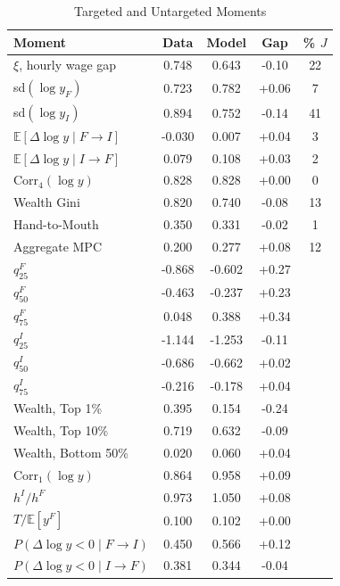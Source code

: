\begin{table}[htbp]
\centering
\caption{Targeted and Untargeted Moments}
\label{tab:moments}
\footnotesize
\begin{tabular}{lcccc}
\toprule
Moment & Data & Model & Gap & \% $J$ \\
\midrule
$\xi$, hourly wage gap & 0.748 & 0.643 & -0.10 & 22 \\
sd$(\log y_F)$ & 0.723 & 0.782 & +0.06 & 7 \\
sd$(\log y_I)$ & 0.894 & 0.752 & -0.14 & 41 \\
$\mathbb{E}[\Delta \log y \mid F \to I]$ & -0.030 & 0.007 & +0.04 & 3 \\
$\mathbb{E}[\Delta \log y \mid I \to F]$ & 0.079 & 0.108 & +0.03 & 2 \\
$\mathrm{Corr}_4(\log y)$ & 0.828 & 0.828 & +0.00 & 0 \\
Wealth Gini & 0.820 & 0.740 & -0.08 & 13 \\
Hand-to-Mouth & 0.350 & 0.331 & -0.02 & 1 \\
Aggregate MPC & 0.200 & 0.277 & +0.08 & 12 \\
\midrule
$q_{25}^{F}$ & -0.868 & -0.602 & +0.27 &  \\
$q_{50}^{F}$ & -0.463 & -0.237 & +0.23 &  \\
$q_{75}^{F}$ & 0.048 & 0.388 & +0.34 &  \\
$q_{25}^{I}$ & -1.144 & -1.253 & -0.11 &  \\
$q_{50}^{I}$ & -0.686 & -0.662 & +0.02 &  \\
$q_{75}^{I}$ & -0.216 & -0.178 & +0.04 &  \\
Wealth, Top 1\% & 0.395 & 0.154 & -0.24 &  \\
Wealth, Top 10\% & 0.719 & 0.632 & -0.09 &  \\
Wealth, Bottom 50\% & 0.020 & 0.060 & +0.04 &  \\
$\mathrm{Corr}_1(\log y)$ & 0.864 & 0.958 & +0.09 &  \\
$h^I / h^F$ & 0.973 & 1.050 & +0.08 &  \\
$T / \mathbb{E}[y^F]$ & 0.100 & 0.102 & +0.00 &  \\
$P(\Delta \log y < 0 \mid F \to I)$ & 0.450 & 0.566 & +0.12 &  \\
$P(\Delta \log y < 0 \mid I \to F)$ & 0.381 & 0.344 & -0.04 &  \\
\bottomrule
\end{tabular}
\end{table}
